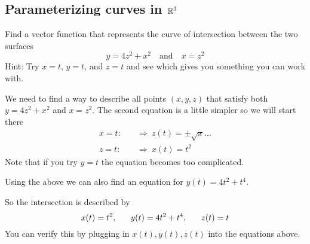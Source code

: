 \documentclass[12pt]{exam}
\begin{document}
\begin{questions}
\newpage

\subsection*{Parameterizing curves in \(\mathbb{R}^3\)}

\question Find a vector function that represents the curve of intersection between the two surfaces 
\[
    y=4z^2+x^2 \quad\text{and}\quad x=z^2
\]
Hint: Try \(x=t\), \(y=t\), and \(z=t\) and see which gives you something you can work with.

    \ifprintanswers
            \begin{solution}
            We need to find a way to describe all points \((x,y,z)\) that satisfy both \(y=4z^2+x^2\) and \(x=z^2\). The second equation is a little simpler so we will start there
                 \begin{align*}
                    x=t:\quad & \Rightarrow ~ z(t)=\pm \sqrt{x}\ldots\\
                    z=t:\quad & \Rightarrow ~ x(t)=t^2
                \end{align*}
            Note that if you try \(y=t\) the equation becomes too complicated.

            Using the above we can also find an equation for \(y(t)=4t^2+t^4\).

            So the intersection is described by 
            \[
                x(t)=t^2,~~ \quad y(t)=4t^2+t^4,~~ \quad z(t)=t \hfill
            \]
            You can verify this by plugging in \(x(t),y(t),z(t)\) into the equations above.

            \end{solution}
        \else
            \vfill
        \fi
\end{questions}
\end{document}
